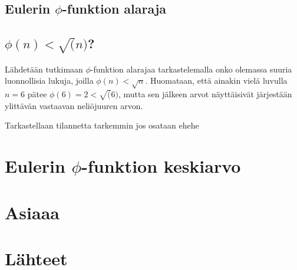 \documentclass{article}
\theoremstyle{definition}
\begin{document}
\subsection{Eulerin $\phi$-funktion alaraja}

\subsection{$\phi(n) < \sqrt(n)$?}

Lähdetään tutkimaan $\phi$-funktion alarajaa tarkastelemalla onko olemassa suuria luonnollisia lukuja, joilla $\phi(n) < \sqrt{n}$. Huomataan, että ainakin vielä luvulla $n=6$ pätee $\phi(6)=2<\sqrt(6)$, mutta sen jälkeen arvot näyttäisivät järjestään ylittävän vastaavan neliöjuuren arvon.

Tarkastellaan tilannetta tarkemmin jos osataan ehehe

\section{Eulerin $\phi$-funktion keskiarvo}

\section{Asiaaa}

\section{Lähteet}

\printbibliography[heading=none]
\end{document}
